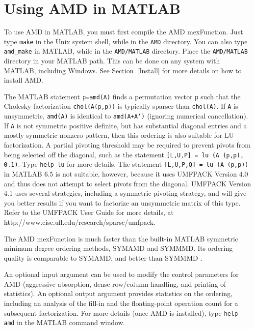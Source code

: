 \documentclass[11pt]{article}
\begin{document}
\section{Using AMD in MATLAB}

To use AMD in MATLAB, you must first compile the AMD mexFunction.
Just type {\tt make} in the Unix system shell, while in the {\tt AMD}
directory.  You can also type {\tt amd\_make} in MATLAB, while in the
{\tt AMD/MATLAB} directory.  Place the {\tt AMD/MATLAB} directory in your
MATLAB path.  This can be done on any system with MATLAB, including Windows.
See Section~\ref{Install} for more details on how to install AMD.

The MATLAB statement {\tt p=amd(A)} finds a permutation vector {\tt p} such
that the Cholesky factorization {\tt chol(A(p,p))} is typically sparser than
{\tt chol(A)}.
If {\tt A} is unsymmetric, {\tt amd(A)} is identical to {\tt amd(A+A')}
(ignoring numerical cancellation).
If {\tt A} is not symmetric positive definite,
but has substantial diagonal entries and a mostly symmetric nonzero pattern,
then this ordering is also suitable for LU factorization.  A partial pivoting
threshold may be required to prevent pivots from being selected off the
diagonal, such as the statement {\tt [L,U,P] = lu (A (p,p), 0.1)}.
Type {\tt help lu} for more details.
The statement {\tt [L,U,P,Q] = lu (A (p,p))} in MATLAB 6.5 is
not suitable, however, because it uses UMFPACK Version 4.0 and thus
does not attempt to select pivots from the diagonal.  UMFPACK Version 4.1
uses several strategies, including a symmetric pivoting strategy, and
will give you better results if you want to factorize an unsymmetric matrix
of this type.  Refer to the UMFPACK User Guide for more details, at
http://www.cise.ufl.edu/research/sparse/umfpack.

The AMD mexFunction is much faster than the built-in MATLAB symmetric minimum
degree ordering methods, SYMAMD and SYMMMD.  Its ordering quality is
comparable to SYMAMD, and better than SYMMMD
\cite{DavisGilbertLarimoreNg04}.

An optional input argument can be used to modify the control parameters for
AMD (aggressive absorption, dense row/column handling, and printing of
statistics).  An optional output
argument provides statistics on the ordering, including an analysis of the
fill-in and the floating-point operation count for a subsequent factorization.
For more details (once AMD is installed),
type {\tt help amd} in the MATLAB command window.
\end{document}
